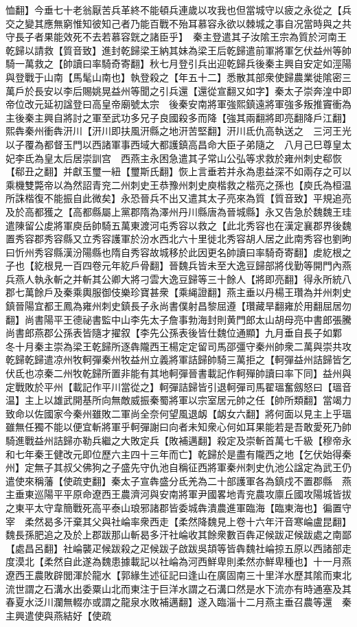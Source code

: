 恤翻】今垂七十老翁厭苦兵革終不能頓兵連歲以攻我也但當城守以疲之永從之【兵交之變其應無窮惟知彼知己者乃能百戰不殆耳慕容永欲以棘城之事自况當時與之共守長子者果能效死不去若慕容皝之諸臣乎】　秦主登遣其子汝隂王宗為質於河南王乾歸以請救【質音致】進封乾歸梁王納其妹為梁王后乾歸遣前軍將軍乞伏益州等帥騎一萬救之【帥讀曰率騎奇寄翻】秋七月登引兵出迎乾歸兵後秦主興自安定如涇陽與登戰于山南【馬髦山南也】執登殺之【年五十二】悉散其部衆使歸農業徙隂密三萬戶於長安以李后賜姚晃益州等聞之引兵還【還從宣翻又如字】秦太子崇奔湟中即帝位改元延初諡登曰高皇帝廟號太宗　後秦安南將軍強熙鎮遠將軍強多叛推竇衝為主後秦主興自將討之軍至武功多兄子良國殺多而降【強其兩翻將即亮翻降戶江翻】熙犇秦州衝犇汧川【汧川即扶風汧縣之地汧苦堅翻】汧川氐仇高執送之　三河王光以子覆為都督玉門以西諸軍事西域大都護鎮高昌命大臣子弟隨之　八月己巳尊皇太妃李氐為皇太后居崇訓宫　西燕主永困急遣其子常山公弘等求救於雍州刺史郗恢【郗丑之翻】并獻玉璽一紐【璽斯氏翻】恢上言垂若并永為患益深不如兩存之可以乘機雙斃帝以為然詔青兖二州刺史王恭豫州刺史庾楷救之楷亮之孫也【庾氏為桓温所誅楷復不能振自此微矣】永恐晉兵不出又遣其太子亮來為質【質音致】平規追亮及於高都獲之【高都縣屬上黨郡隋為澤州丹川縣唐為晉城縣】永又告急於魏魏王珪遣陳留公䖍將軍庾岳帥騎五萬東渡河屯秀容以救之【此北秀容也在漢定襄郡界後魏置秀容郡秀容縣又立秀容護軍於汾水西北六十里徙北秀容胡人居之此南秀容也劉昫曰忻州秀容縣漢汾陽縣也隋自秀容故城移於此因更名帥讀曰率騎奇寄翻】䖍紇根之子也【紇根見一百四卷元年紇戶骨翻】晉魏兵皆未至大逸豆歸部將伐勤等開門內燕兵燕人執永斬之并斬其公卿大將刁雲大逸豆歸等三十餘人【將即亮翻】得永所統八郡七萬餘戶及秦乘輿服御伎樂珍寶甚衆【乘䋲證翻】燕主垂以丹楊王瓚為并州刺史鎮晉陽宜都王鳳為雍州刺史鎮長子永尚書僕射昌黎屈遵【瓚藏旱翻雍於用翻屈居勿翻】尚書陽平王德祕書監中山李先太子詹事勃海封則黄門郎太山胡母亮中書郎張騰尚書郎燕郡公孫表皆隨才擢叙【李先公孫表後皆仕魏位通顯】九月垂自長子如鄴　冬十月秦主崇為梁王乾歸所逐犇隴西王楊定定留司馬邵彊守秦州帥衆二萬與崇共攻乾歸乾歸遣凉州牧軻彈秦州牧益州立義將軍詰歸帥騎三萬拒之【軻彈益州詰歸皆乞伏氐也凉秦二州牧乾歸所置非能有其地軻彈晉書載記作軻殫帥讀曰率下同】益州與定戰敗於平州【載記作平川當從之】軻彈詰歸皆引退軻彈司馬翟瑥奮劔怒曰【瑥音温】主上以雄武開基所向無敵威振秦蜀將軍以宗室居元帥之任【帥所類翻】當竭力致命以佐國家今秦州雖敗二軍尚全奈何望風退衂【衂女六翻】將何面以見主上乎瑥雖無任獨不能以便宜斬將軍乎軻彈謝曰向者未知衆心何如耳果能若是吾敢愛死乃帥騎進戰益州詰歸亦勒兵繼之大敗定兵【敗補邁翻】殺定及崇斬首萬七千級【穆帝永和七年秦王健改元即位歷六主四十三年而亡】乾歸於是盡有隴西之地【乞伏始得秦州】定無子其叔父佛狗之子盛先守仇池自稱征西將軍秦州刺史仇池公諡定為武王仍遣使來稱藩【使疏吏翻】秦太子宣犇盛分氐羌為二十部護軍各為鎮戍不置郡縣　燕主垂東巡陽平平原命遼西王農濟河與安南將軍尹國畧地青兖農攻廪丘國攻陽城皆拔之東平太守韋簡戰死高平泰山琅邪諸郡皆委城犇潰農進軍臨海【臨東海也】徧置守宰　柔然曷多汗棄其父與社崘率衆西走【柔然降魏見上卷十六年汗音寒崘盧昆翻】魏長孫肥追之及於上郡跋那山斬曷多汗社崘收其餘衆數百犇疋候跋疋候跋處之南鄙【處昌呂翻】社崘襲疋候跋殺之疋候跋子啟跋吳頡等皆犇魏社崘掠五原以西諸部走度漠北【柔然自此遂為魏患據載記以社崘為河西鮮卑則柔然亦鮮卑種也】十一月燕遼西王農敗辟閭渾於龍水【郭緣生述征記曰逢山在廣固南三十里洋水歷其隂而東北流世謂之石溝水出委粟山北而東注于巨洋水謂之石溝口然是水下流亦有時通塞及其春夏水泛川瀾無輟亦或謂之龍泉水敗補邁翻】遂入臨淄十二月燕主垂召農等還　秦主興遣使與燕結好【使疏